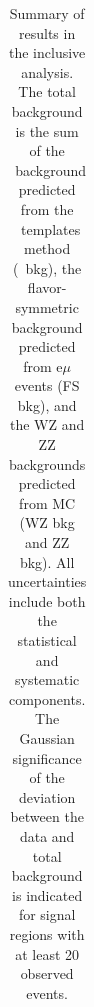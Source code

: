 \begin{table}[htb]
\begin{center}
\footnotesize
\caption{\label{tab:results_incl} Summary of results in the inclusive analysis. The total background is the sum of the \zjets\ background predicted from
the \MET\ templates method (\zjets\ bkg), the flavor-symmetric background predicted from e$\mu$ events (FS bkg), and the WZ and ZZ backgrounds predicted from MC
(WZ bkg and ZZ bkg). All uncertainties include both the statistical and systematic components. The Gaussian significance of the deviation between the data 
and total background is indicated for signal regions with at least 20 observed events. }
\begin{tabular}{l|c|c|c|c|c|c}




\hline
\hline


\end{tabular}
\end{center}
\end{table}
